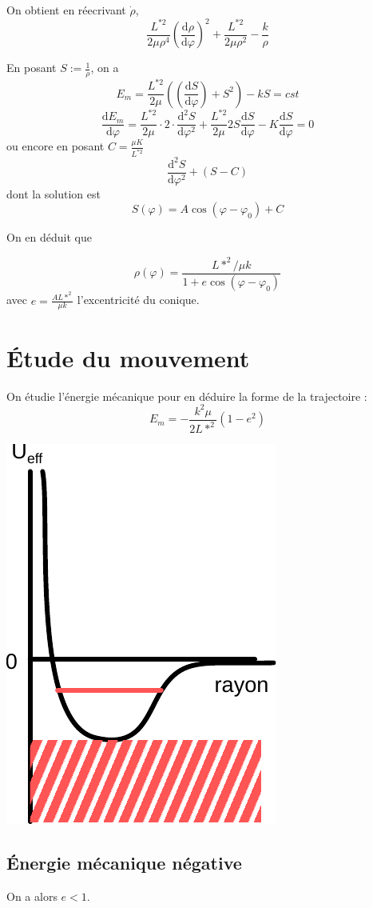 \documentclass[french]{yLectureNote}
\newcommand{\dd}{\mathrm{d}}
\begin{document}
On obtient en réecrivant \(\dot{\rho}\), \[\frac{L^{*2}}{2\mu \rho^4}(\frac{\dd \rho}{\dd \varphi})^2 + \frac{L^{*2}}{2\mu \rho^2} - \frac{k}{\rho}\]

En posant \(S := \frac{1}{\rho}\), on a \[E_m = \frac{L^{*2}}{2\mu}((\frac{\dd S}{\dd \varphi})+S^2)-kS = cst\]
\[\frac{\dd E_m}{\dd \varphi} = \frac{L^{*2}}{2\mu}\cdot 2\cdot \frac{\dd^2 S}{\dd \varphi^2}+ \frac{L^{*2}}{2\mu}2S\frac{\dd S}{\dd \varphi} - K\frac{\dd S}{\dd \varphi} = 0\]
ou encore en posant \(C = \frac{\mu K}{L^{*2}}\)\[\frac{\dd^2 S}{\dd \varphi^2}+ (S-C)\]  dont la solution est \[S(\varphi) = A\cos(\varphi-\varphi_0)+C\]

On en déduit que
\begin{theorem}
 \[\rho(\varphi) = \frac{L*^2/\mu k}{1+e\cos(\varphi-\varphi_0)}\] avec \(\displaystyle e = \frac{AL*^2}{\mu k}\) l'excentricité du conique.
\end{theorem}
\section{Étude du mouvement}
On étudie l'énergie mécanique pour en déduire la forme de la trajectoire : \[E_m = -\frac{k^2\mu}{2L*^2}(1-e^2)\]

\includegraphics[scale=0.5]{ueff}
\subsection{Énergie mécanique négative}
On a alors \(e<1\).
\end{document}

